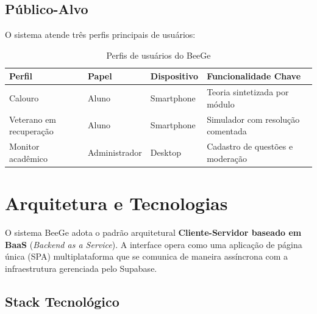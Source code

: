 \documentclass[12pt, a4paper]{article}
\begin{document}
\subsection{P\'{u}blico-Alvo}

O sistema atende tr\^{e}s perfis principais de usu\'{a}rios:

\begin{table}[H]
\centering
\caption{Perfis de usu\'{a}rios do BeeGe}
\begin{tabularx}{\textwidth}{l l l X}
\toprule
\textbf{Perfil} & \textbf{Papel} & \textbf{Dispositivo} & \textbf{Funcionalidade Chave} \\
\midrule
Calouro & Aluno & Smartphone & Teoria sintetizada por m\'{o}dulo \\
Veterano em recupera\c{c}\~{a}o & Aluno & Smartphone & Simulador com resolu\c{c}\~{a}o comentada \\
Monitor acad\^{e}mico & Administrador & Desktop & Cadastro de quest\~{o}es e modera\c{c}\~{a}o \\
\bottomrule
\end{tabularx}
\end{table}

\section{Arquitetura e Tecnologias}

O sistema BeeGe adota o padr\~{a}o arquitetural \textbf{Cliente-Servidor baseado em BaaS} (\textit{Backend as a Service}). A interface opera como uma aplica\c{c}\~{a}o de p\'{a}gina \'{u}nica (SPA) multiplataforma que se comunica de maneira ass\'{i}ncrona com a infraestrutura gerenciada pelo Supabase.

\subsection{Stack Tecnol\'{o}gico}
\end{document}
